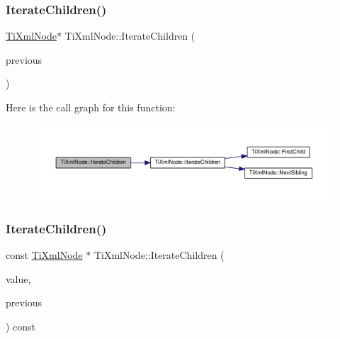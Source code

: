 \subsubsection{\texorpdfstring{Iterate\+Children()}{IterateChildren()}\hspace{0.1cm}{\footnotesize\ttfamily [2/4]}}
{\footnotesize\ttfamily \hyperlink{class_ti_xml_node}{Ti\+Xml\+Node}$\ast$ Ti\+Xml\+Node\+::\+Iterate\+Children (\begin{DoxyParamCaption}\item[{const \hyperlink{class_ti_xml_node}{Ti\+Xml\+Node} $\ast$}]{previous }\end{DoxyParamCaption})\hspace{0.3cm}{\ttfamily [inline]}}

Here is the call graph for this function\+:\nopagebreak
\begin{figure}[H]
\begin{center}
\leavevmode
\includegraphics[width=350pt]{class_ti_xml_node_a2358e747118fdbf0e467b1e4f7d03de1_cgraph}
\end{center}
\end{figure}
\mbox{\label{class_ti_xml_node_a74bc68a536c279a42af346cb1454f143}} 
\subsubsection{\texorpdfstring{Iterate\+Children()}{IterateChildren()}\hspace{0.1cm}{\footnotesize\ttfamily [3/4]}}
{\footnotesize\ttfamily const \hyperlink{class_ti_xml_node}{Ti\+Xml\+Node} $\ast$ Ti\+Xml\+Node\+::\+Iterate\+Children (\begin{DoxyParamCaption}\item[{const char $\ast$}]{value,  }\item[{const \hyperlink{class_ti_xml_node}{Ti\+Xml\+Node} $\ast$}]{previous }\end{DoxyParamCaption}) const}



